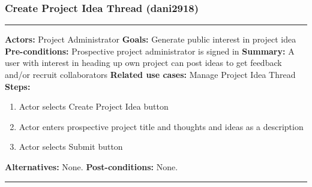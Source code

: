 \documentclass[11pt]{report}
\begin{document}
\subsubsection{Create Project Idea Thread (dani2918)}
\vspace{2pt}
\hrule
\vspace{8pt}
 \textbf{Actors:} Project Administrator \newline
\textbf{Goals:} Generate public interest in project idea  \newline
 \textbf{Pre-conditions:} Prospective project administrator is signed in  \newline
 \textbf{Summary:}  A user with interest in heading up own project can post ideas to get feedback and/or recruit collaborators \newline
\textbf{Related use cases:} Manage Project Idea Thread \newline
\textbf{Steps:} \begin{enumerate}
  \item Actor selects Create Project Idea button
  \item Actor enters prospective project title and thoughts and ideas as a description
  \item Actor selects Submit button
 \end{enumerate}
 \textbf{Alternatives:} None. \newline
 \textbf{Post-conditions:} None. \newline
\vspace{8pt}
\hrule
\newpage
\end{document}
